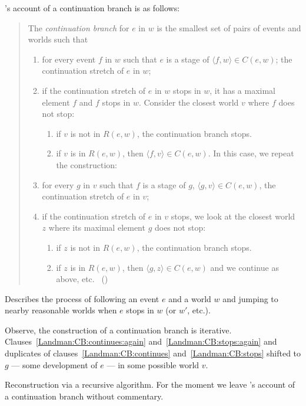 \begin{note}
  \citeauthor{Landman:1992wh}'s account of a continuation branch is as follows:
  \begin{quote}
    The \emph{continuation branch} for \(e\) in \(w\) is the smallest set of pairs of events and worlds such that
    \begin{enumerate}
    \item
      \label{Landman:CB:continues}
      for every event \(f\) in \(w\) such that \(e\) is a stage of \(\langle f,w \rangle \in C(e,w)\);
      the continuation stretch of \(e\) in \(w\);
    \item
      \label{Landman:CB:stops}
      if the continuation stretch of \(e\) in \(w\) stops in \(w\), it has a maximal element \(f\) and \(f\) stops in \(w\).
      Consider the closest world \(v\) where \(f\) does not stop:
      \begin{enumerate}[label=--]
      \item
        if \(v\) is not in \(R(e, w)\), the continuation branch stops.
      \item
        if \(v\) is in \(R(e, w)\), then \(\langle f,v \rangle \in C(e,w)\).
        In this case, we repeat the construction:
      \end{enumerate}
    \item
      \label{Landman:CB:continues:again}
      for every \(g\) in \(v\) such that \(f\) is a stage of \(g\), \(\langle g,v \rangle \in C(e,w)\), the continuation stretch of \(e\) in \(v\);
    \item
      \label{Landman:CB:stops:again}
      if the continuation stretch of \(e\) in \(v\) stops, we look at the closest world \(z\) where its maximal element \(g\) does not stop:
      \begin{enumerate}[label=--]
      \item
        if \(z\) is not in \(R(e, w)\), the continuation branch stops.
      \item
        if \(z\) is in \(R(e, w)\), then \(\langle g,z \rangle \in C(e,w)\) and we continue as above, etc.%
        \mbox{ }\hfill\mbox{(\citeyear[26--27]{Landman:1992wh})}
      \end{enumerate}
    \end{enumerate}
  \end{quote}

  Describes the process of following an event \(e\) and a world \(w\) and jumping to nearby reasonable worlds when \(e\) stops in \(w\) (or \(w'\), etc.).

  Observe, the construction of a continuation branch is iterative.
  Clauses~\ref{Landman:CB:continues:again} and~\ref{Landman:CB:stops:again} and duplicates of clauses~\ref{Landman:CB:continues} and~\ref{Landman:CB:stops} shifted to \(g\) --- some development of \(e\) --- in some possible world \(v\).

  Reconstruction via a recursive algorithm.
  For the moment we leave \citeauthor{Landman:1992wh}'s account of a continuation branch without commentary.
\end{note}

